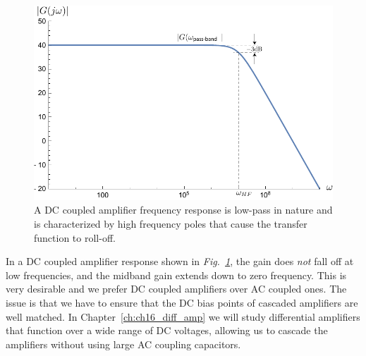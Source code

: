 \begin{figure}[tb]
\centering
\includegraphics[width=.75\columnwidth]{amp_dccoup} 
\caption{A DC coupled amplifier frequency response is low-pass in nature and is characterized by high frequency poles that cause the transfer function to roll-off.}
\label{fig:amp_dccoup}
\end{figure}
In a DC coupled amplifier response shown in \emph{Fig.~\ref{fig:amp_dccoup}}, the gain does \textit{not} fall off at low frequencies, and the midband gain extends down to zero frequency. This is very desirable and we prefer DC coupled amplifiers over AC coupled ones.  The issue is that we have to ensure that the DC bias points of cascaded amplifiers are well matched.  In Chapter~\ref{ch:ch16_diff_amp} we will study differential amplifiers that function over a wide range of DC voltages, allowing us to cascade the amplifiers without using large AC coupling capacitors.
